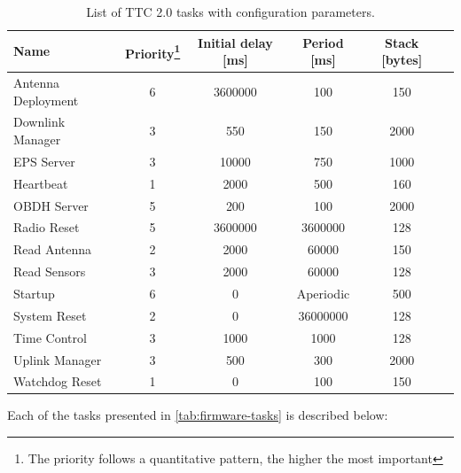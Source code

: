 \begin{table}[!ht]
    \centering

    \begin{tabular}{lccccc}
        \toprule[1.5pt]
        \textbf{Name}          & \textbf{Priority\footnote{The priority follows a quantitative pattern, the higher the most important}} & \textbf{Initial delay [ms]} & \textbf{Period [ms]} & \textbf{Stack [bytes]} \\
        \midrule
        Antenna Deployment     & 6  & 3600000 & 100       & 150  \\
        Downlink Manager       & 3  & 550     & 150       & 2000 \\
        EPS Server             & 3  & 10000   & 750       & 1000 \\
        Heartbeat              & 1  & 2000    & 500       & 160  \\
        OBDH Server            & 5  & 200     & 100       & 2000 \\
        Radio Reset            & 5  & 3600000 & 3600000   & 128  \\
        Read Antenna           & 2  & 2000    & 60000     & 150  \\
        Read Sensors           & 3  & 2000    & 60000     & 128  \\
        Startup                & 6  & 0       & Aperiodic & 500  \\
        System Reset           & 2  & 0       & 36000000  & 128  \\
        Time Control           & 3  & 1000    & 1000      & 128  \\
        Uplink Manager         & 3  & 500     & 300       & 2000 \\
        Watchdog Reset         & 1  & 0       & 100       & 150  \\
        \bottomrule[1.5pt]
    \end{tabular}
    \caption{List of TTC 2.0 tasks with configuration parameters.}
    \label{tab:firmware-tasks}
\end{table}

Each of the tasks presented in \autoref{tab:firmware-tasks} is described below:

